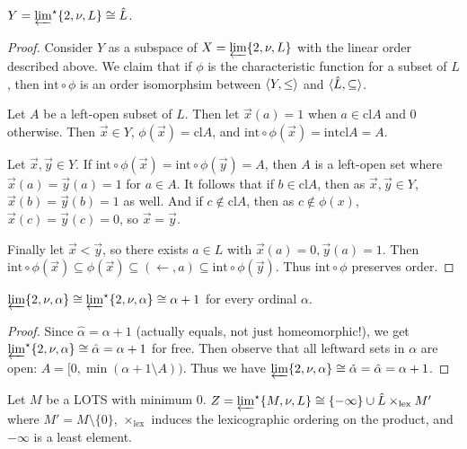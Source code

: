 \documentclass[11pt]{article}
\renewcommand{\int}{\textrm{int}}
\renewcommand{\cl}{\textrm{cl}}
\newcommand{\lexTimes}{\times_{\textrm{lex}}}
\newcommand{\vect}{\vec}
\begin{document}
  \begin{theorem}
    \(Y=\varprojlim^\star \{2, \nu, L\}\cong \hat L\).
  \end{theorem}

  \begin{proof}
    Consider \(Y\) as a subspace of \(X=\varprojlim \{2, \nu, L\}\) with
    the linear order described above. We claim that if \(\phi\) is the
    characteristic function for a subset of \(L\), then \(\int\circ\phi\)
    is an order isomorphsim between \(\langle Y,\leq\rangle\) and
    \(\langle\hat L,\subseteq\rangle\).

    Let \(A\) be a left-open subset of \(L\). Then let \(\vect x(a)=1\) when
    \(a\in\cl A\) and \(0\) otherwise. Then \(\vect x\in Y\),
    \(\phi(\vect x)=\cl A\), and \(\int\circ\phi(\vect x)=\int\cl A=A\).

    Let \(\vect x,\vect y\in Y\). If
    \(\int\circ\phi(\vect x)=\int\circ\phi(\vect y)=A\), then \(A\) is a
    left-open set where \(\vect x(a)=\vect y(a)=1\) for \(a\in A\). It follows
    that if \(b\in\cl A\), then as \(\vect x,\vect y\in Y\),
    \(\vect x(b)=\vect y(b)=1\) as well. And if \(c\not\in\cl A\), then
    as \(c\not\in\phi(x)\),
    \(\vect x(c)=\vect y(c)=0\), so \(\vect x=\vect y\).

    Finally let \(\vect x<\vect y\), so there exists \(a\in L\) with
    \(\vect x(a)=0,\vect y(a)=1\). Then
    \(
      \int\circ\phi(\vect x)
        \subseteq
      \phi(\vect x)
        \subseteq
      (\leftarrow,a)
        \subseteq
      \int\circ\phi(\vect y)
    \). Thus \(\int\circ\phi\) preserves order.
  \end{proof}

  \begin{corollary}
    \(
      \varprojlim \{2, \nu, \alpha\}
      \cong
      \varprojlim^\star \{2, \nu, \alpha\}
      \cong
      \alpha+1
    \)
    for every ordinal \(\alpha\).
  \end{corollary}

  \begin{proof}
    Since \(\hat\alpha=\alpha+1\) (actually equals, not just homeomorphic!),
    we get \(\varprojlim^\star \{2, \nu, \alpha\}
      \cong \hat\alpha =
    \alpha+1\) for free. Then observe that all leftward sets in \(\alpha\) are
    open: \(A=[0,\min(\alpha+1\setminus A))\).
    Thus we have
    \(\varprojlim \{2, \nu, \alpha\}\cong\check\alpha=\hat\alpha=\alpha+1\).
  \end{proof}

  \begin{theorem}
    Let \(M\) be a LOTS with minimum \(0\).
    \(Z=\varprojlim^\star \{M, \nu, L\}\cong \{-\infty\}\cup \hat L\lexTimes M'\)
    where \(M'=M\setminus\{0\}\),
    \(\lexTimes\) induces the lexicographic ordering on the product,
    and \(-\infty\) is a least element.
  \end{theorem}
\end{document}
